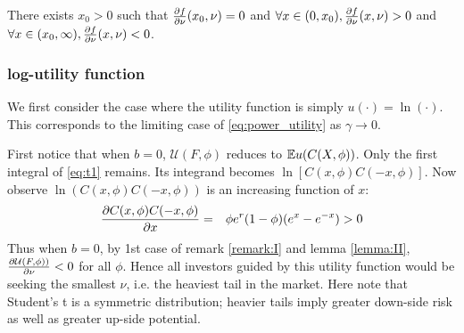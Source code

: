 \documentclass{article}
\begin{document}
\begin{lemma}
  \label{lemma:II}
  There exists $x_0 > 0$ such that $\frac{\partial f}{\partial \nu}(x_0, \nu) = 0$ and
  $\forall x \in (0, x_0), \frac{\partial f}{\partial \nu}(x, \nu) > 0$ and
  $\forall x \in (x_0, \infty), \frac{\partial f}{\partial \nu}(x, \nu) < 0$.
\end{lemma}

\subsubsection{log-utility function}
We first consider the case where the utility function is simply
$u(\cdot) = \ln(\cdot)$. This corresponds to the limiting case of
\eqref{eq:power_utility} as $\gamma \to 0$.

First notice that when $b = 0$, $\mathcal U(F, \phi)$ reduces to
$\mathbb{E} u(C(X, \phi))$. Only the first integral of \eqref{eq:t1} remains.
Its integrand becomes $\ln[C(x, \phi) C(-x, \phi)]$.
Now observe $\ln(C(x, \phi)C(-x, \phi))$ is an increasing function of
$x$:
\begin{eqnarray*}
  \frac{\partial C(x, \phi) C(-x, \phi)}{\partial x}
  &=&
  \phi e^r (1 - \phi) (e^x - e^{-x}) > 0
\end{eqnarray*}
Thus when $b = 0$, by 1st case of remark \ref{remark:I} and lemma
\ref{lemma:II},
$\frac{\partial \mathcal U(F, \phi))}{\partial \nu} < 0$ for all $\phi$. Hence all
investors guided by this utility function would be seeking the
smallest $\nu$, i.e. the heaviest tail in the market. Here note that
Student's t is a symmetric distribution; heavier tails imply greater
down-side risk as well as greater up-side potential.
\end{document}
